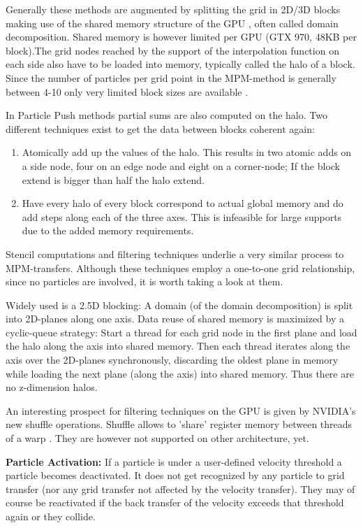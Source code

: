 \documentclass[m,times]{cgMA}
\begin{document}
Generally these methods are augmented by splitting the grid in 2D/3D blocks making use of the shared memory structure of the GPU \cite{PIC:GPU} \cite{honig2010generic} \cite{MPM:GPU}, often called domain decomposition. Shared memory is however limited per GPU (GTX 970, 48KB per block).The grid nodes reached by the support of the interpolation function on each side also have to be loaded into memory, typically called the halo of a block. Since the number of particles per grid point in the MPM-method is generally between 4-10 only very limited block sizes are available \cite{MPM:SNOW}.

In Particle Push methods partial sums are also computed on the halo. Two different techniques exist to get the data between blocks coherent again:
\begin{enumerate}
\item Atomically add up the values of the halo. This results in two atomic adds on a side node, four on an edge node and eight on a corner-node; If the block extend is bigger than half the halo extend.
\item Have every halo of every block correspond to actual global memory and do add steps along each of the three axes. This is infeasible for large supports due to the added memory requirements. \cite{crassin2011interactive}
\end{enumerate}
Stencil computations and filtering techniques underlie a very similar process to MPM-transfers. Although these techniques employ a one-to-one grid relationship, since no particles are involved, it is worth taking a look at them.

Widely used is a 2.5D blocking: A domain (of the domain decomposition) is split into 2D-planes along one axis. Data reuse of shared memory is maximized by a cyclic-queue strategy: Start a thread for each grid node in the first plane and load the halo along the axis into shared memory. Then each thread iterates along the axis over the 2D-planes synchronously, discarding the oldest plane in memory while loading the next plane (along the axis) into shared memory. Thus there are no z-dimension halos. \cite{brandvik2010sblock} \cite{williams2007scientific} \cite{krotkiewski2013efficient}

An interesting prospect for filtering techniques on the GPU is given by NVI\-DIA's new shuffle operations. Shuffle allows to 'share' register memory between threads of a warp \cite{NVIDIA:SHUFFLE}. They are however not supported on other architecture, yet.

\textbf{Particle Activation:} If a particle is under a user-defined velocity threshold a particle becomes deactivated. It does not get recognized by any particle to grid transfer (nor any grid transfer not affected by the velocity transfer). They may of course be reactivated if the back transfer of the velocity exceeds that threshold again or they collide. \cite{MPM:GPU}
\end{document}
